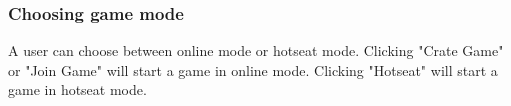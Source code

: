 \subsubsection{Choosing game mode}
A user can choose between online mode or hotseat mode. Clicking "Crate Game" or "Join Game" will start a game in online mode. Clicking "Hotseat" will start a game in hotseat mode.
\label{section:game_mode}
\begin{figure}[H]
	\centering
	\mbox{
	}	
\end{figure}

